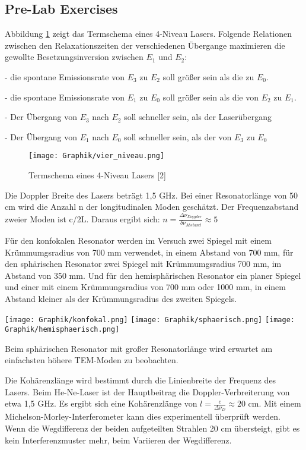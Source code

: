 \documentclass[10pt,twoside]{article}
\renewcommand{\1}{^{-1}}
\renewcommand{\2}{^{-2}}
\newcommand{\3}{^{-3}}
\newcommand{\4}{^{-4}}
\newcommand{\5}{^{-5}}
\newcommand{\6}{^{-6}}
\newcommand{\7}{^{-7}}
\newcommand{\8}{^{-8}}
\newcommand{\9}{^{-9}}
\begin{document}
\subsection{Pre-Lab Exercises}

Abbildung \ref{fig:vier_niveau} zeigt das Termschema eines 4-Niveau Lasers.
Folgende Relationen zwischen den Relaxationszeiten der verschiedenen Übergange maximieren die gewollte Besetzungsinversion zwischen $E_1$ und $E_2$:

- die spontane Emissionsrate von $E_3$ zu $E_2$ soll größer sein als die zu $E_0$.

- die spontane Emissionsrate von $E_1$ zu $E_0$ soll größer sein als die von $E_2$ zu $E_1$.

- Der Übergang von $E_3$ nach $E_2$ soll schneller sein, als der Laserübergang

- Der Übergang von $E_1$ nach $E_0$ soll schneller sein, als der von $E_3$ zu $E_0$

\begin{figure}
\centering
\texttt{[image: Graphik/vier\_niveau.png]} 
\caption{Termschema eines 4-Niveau Lasers [2]}
\label{fig:vier_niveau}
\end{figure}

Die Doppler Breite des Lasers beträgt 1,5 GHz. Bei einer Resonatorlänge von 50 cm wird die Anzahl n der longitudinalen Moden geschätzt.
Der Frequenzabstand zweier Moden ist c/2L. Daraus ergibt sich:
$n = \frac{\Delta \nu_{Doppler}}{\delta \nu_{Abstand}} \approx 5$

\newpage
Für den konfokalen Resonator werden im Versuch zwei Spiegel mit einem Krümmumgsradius von 700 mm verwendet, in einem Abstand von 700 mm,
für den sphärischen Resonator zwei Spiegel mit Krümmumgsradius 700 mm, im Abstand von 350 mm.
Und für den hemisphärischen Resonator ein planer Spiegel und einer mit einem Krümmungsradius von 700 mm oder 1000 mm, in einem Abstand kleiner als der Krümmungsradius des zweiten Spiegels.

\texttt{[image: Graphik/konfokal.png]} 
\texttt{[image: Graphik/sphaerisch.png]} 
\texttt{[image: Graphik/hemisphaerisch.png]} 

Beim sphärischen Resonator mit großer Resonatorlänge wird erwartet am einfachsten höhere TEM-Moden zu beobachten.


Die Kohärenzlänge wird bestimmt durch die Linienbreite der Frequenz des Lasers. Beim He-Ne-Laser ist der Hauptbeitrag die Doppler-Verbreiterung von etwa 1,5 GHz. Es ergibt sich eine Kohärenzlänge von $l=\frac{c}{\Delta \nu_{D}} \approx 20$ cm.
Mit einem Michelson-Morley-Interferometer kann dies experimentell überprüft werden. Wenn die Wegdifferenz der beiden aufgeteilten Strahlen 20 cm übersteigt, gibt es kein Interferenzmuster mehr, beim Variieren der Wegdifferenz.
\end{document}
